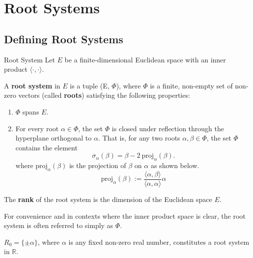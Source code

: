 \chapter{Root Systems}
\section{Defining Root Systems}

\begin{nameddefinition}{Root System}
    Let $E$ be a finite-dimensional Euclidean space with an inner product $\langle \cdot, \cdot \rangle$. \newline
    
    A \textbf{root system} in $E$ is a tuple (E, $\Phi$), where $\Phi$ is a finite, non-empty set of non-zero vectors (called
    \textbf{roots}) satisfying the following properties:
    
    \begin{enumerate}[label=(R{\arabic*})]
        \item $\Phi$ spans $E$.
        \item For every root $\alpha \in \Phi$, the set $\Phi$ is closed under reflection through the hyperplane orthogonal to $\alpha$.
        That is, for any two roots $\alpha, \beta \in \Phi$, the set $\Phi$ contains the element
        \begin{equation*}
            \sigma_\alpha(\beta) = \beta - 2 \ \text{proj}_{\alpha}(\beta).
        \end{equation*}
        where $\text{proj}_{\alpha}(\beta)$ is the projection of $\beta$ on $\alpha$ as shown below.
        \begin{equation*}
            \text{proj}_{\alpha}(\beta) := \frac{ \langle \alpha, \beta \rangle}{\langle \alpha, \alpha \rangle} \alpha
        \end{equation*}
    \end{enumerate}

    The \textbf{rank} of the root system is the dimension of the Euclidean space $E$.
\end{nameddefinition}

For convenience and in contexts where the inner product space is clear, the root system is often referred to simply as $\Phi$.

\begin{example}
    $R_0 = \{\pm \alpha\}$, where $\alpha$ is any fixed non-zero real number, constitutes a root system in $\mathbb{R}$.
\end{example}

